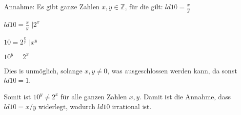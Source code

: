 \documentclass[../main.tex]{subfiles}
\begin{document}
\begin{enumerate}
\begin{enumerate}
				Annahme: Es gibt ganze Zahlen \( x,y \in \mathbb{Z} \), für die gilt:
				\( ld 10 = \frac{x}{y} \)

				\( ld 10 = \frac{x}{y} \) \( | 2^x \)

				\( 10 = 2^\frac{x}{y} \) \( | x^y \)

				\( 10^y = 2^x \)

				Dies is unmöglich, solange \( x, y \neq 0 \), was ausgeschlossen werden kann, da sonst
				\( ld 10 = 1 \).

				Somit ist \( 10^y \neq 2^x \) für alle ganzen Zahlen \( x,y \). Damit ist die
				Annahme, dass \( ld 10 =  x / y  \) widerlegt, wodurch \( ld 10  \) irrational ist.
	      \end{enumerate}
\end{enumerate}
\end{document}

